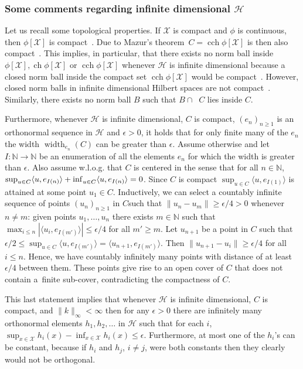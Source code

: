 \documentclass[10pt]{amsart}
\theoremstyle{definition}\newtheorem{defi}[theo]{Definition}\newtheorem{rema}[theo]{Remark}\newtheorem{exam}[theo]{Example}\newtheorem{exem}[theo]{Example}\newtheorem{nota}[theo]{Notation}
\theoremstyle{remark}
\DeclareMathOperator*{\infd}{inf\vphantom{p}}
\DeclareMathOperator{\cch}{cch}
\DeclareMathOperator{\ch}{ch}
\DeclareMathOperator{\caff}{\overline{aff}}
\DeclareMathOperator{\diame}{width}
\newcommand{\bbN}{\mathbb{N}}
\newcommand{\X}{\mathcal{X}}
\newcommand{\cH}{\mathcal{H}}
\begin{document}
\subsubsection{Some comments regarding infinite dimensional \texorpdfstring{$\cH$}{cH}} \label{sec:width_infty}
Let us recall some topological properties. If $\X$ is compact and $\phi$ is continuous, then $\phi[\X]$ is compact~\cite[Theorem~3.1.10]{ENG89}. Due to Mazur's theorem~$C = \cch \phi[\X]$ is then also compact~\cite[Theorem~12, p.~51]{DIES77}. This implies, in particular, that there exists no norm ball inside $\phi[\X], \ch \phi[\X]$ or $\cch \phi[\X]$ whenever $\cH$ is infinite dimensional because a closed norm ball inside the compact set $\cch \phi[\X]$ would be compact~\cite[Theorem~3.1.2]{ENG89}. However, closed norm balls in infinite dimensional Hilbert spaces are not compact~\cite[Section~I.2.7]{Wer02}. Similarly, there exists no norm ball $B$ such that $B \cap \caff C$ lies inside $C$.

Furthermore, whenever $\cH$ is infinite dimensional, $C$ is compact, $(e_n)_{n\geq 1}$ is an orthonormal sequence in $\cH$ and $\epsilon >0$, it holds that for only finite many of the $e_n$ the width $\diame_{e_n}(C)$ can be greater than $\epsilon$. Assume otherwise and let $I:\bbN \rightarrow \bbN$ be an enumeration of all the elements $e_n$ for which the width is greater than $\epsilon$. Also assume w.l.o.g. that $C$ is centered in the sense that for all $n \in \bbN$, $\sup_{u \in C} \langle u,e_{I(n)}\rangle + \infd_{u\in C} \langle u, e_{I(n)} \rangle = 0$. Since $C$ is compact $\sup_{u \in C} \langle u,e_{I(1)}\rangle$ is attained at some point $u_1 \in C$. Inductively, we can select a countably infinite sequence of points $(u_n)_{n\geq 1}$ in $C$\linebreak such that $\|u_n - u_m\| \geq \epsilon/4 > 0$ whenever $n\not = m$: given points $u_1,\dots, u_n$ there exists $m\in \bbN$ such that $\max_{i\leq n} |\langle u_i, e_{I(m')} \rangle | \leq \epsilon/4$ for all $m' \geq m$. Let $u_{n+1}$ be a point in $C$ such that $\epsilon/2 \leq \sup_{u \in C} \langle u,e_{I(m')}\rangle = \langle u_{n+1}, e_{I(m')} \rangle$. Then $\|u_{n+1} - u_i\| \geq \epsilon/4$ for all $i\leq n$. Hence, we have countably infinitely many points with distance of at least $\epsilon/4$ between them. These points give rise to an open cover of $C$ that does not contain a~finite sub-cover, contradicting the compactness of $C$.

This last statement implies that whenever $\cH$ is infinite dimensional, $C$ is compact, and $\|k\|_\infty < \infty$ then for any $\epsilon>0$ there are infinitely many orthonormal elements $h_1,h_2, \dots$ in $\cH$ such that for each $i$, $\sup_{x\in \X} h_i(x) - \inf_{x\in \X} h_i(x) \leq \epsilon$. Furthermore, at most one of the $h_i$'s can be constant, because if $h_i$ and $h_j$, $i\not=j$, were both constants then they clearly would not be orthogonal.
\end{document}
